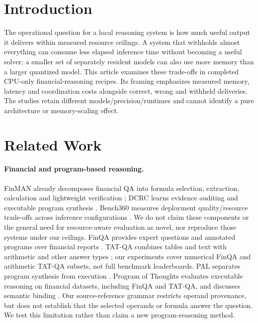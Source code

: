 \documentclass[computers,article,submit,moreauthors]{Definitions/mdpi}
\begin{document}
\doinum{}
\fancyfoot[R]{}
\section{Introduction}The operational question for a local reasoning system is how much useful output it delivers within measured resource ceilings. A system that withholds almost everything can consume less elapsed inference time without becoming a useful solver; a smaller set of separately resident models can also use more memory than a larger quantized model. This article examines these trade-offs in completed CPU-only financial-reasoning recipes. Its framing emphasizes measured memory, latency and coordination costs alongside correct, wrong and withheld deliveries. The studies retain different models/precision/runtimes and cannot identify a pure architecture or memory-scaling effect.\section{Related Work}
\paragraph{Financial and program-based reasoning.}
FinMAN already decomposes financial QA into formula selection, extraction, calculation and lightweight verification \citep{finman}; DCRC learns evidence auditing and executable program synthesis \citep{dcrc}. Bench360 measures deployment quality/resource trade-offs across inference configurations \citep{bench360}. We do not claim these components or the general need for resource-aware evaluation as novel, nor reproduce those systems under our ceilings.
FinQA provides expert questions and annotated programs over financial reports \citep{finqa}. TAT-QA combines tables and text with arithmetic and other answer types \citep{tatqa}; our experiments cover numerical FinQA and arithmetic TAT-QA subsets, not full benchmark leaderboards. PAL separates program synthesis from execution \citep{pal}. Program of Thoughts evaluates executable reasoning on financial datasets, including FinQA and TAT-QA, and discusses semantic binding \citep{pot}. Our source-reference grammar restricts operand provenance, but does not establish that the selected operands or formula answer the question. We test this limitation rather than claim a new program-reasoning method.
\end{document}
